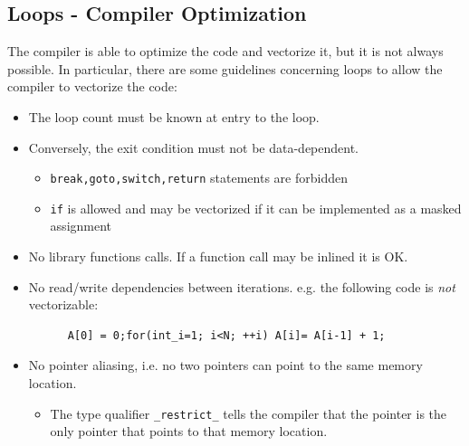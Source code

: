 \subsection{Loops - Compiler Optimization}
The compiler is able to optimize the code and vectorize it, but it is not always possible.
In particular, there are some guidelines concerning loops to allow the compiler to vectorize the code:
\begin{itemize}
   \item The loop count must be known at entry to the loop.
   \item Conversely, the exit condition must not be data-dependent.
   \begin{itemize}
      \item \texttt{break,goto,switch,return} statements are forbidden
      \item \texttt{if} is allowed and may be vectorized if it can be implemented as a masked assignment
   \end{itemize}
   \item No library functions calls. If a function call may be inlined it is OK.
   \item No read/write dependencies between iterations. e.g. the following code is \textit{not} vectorizable:
   \begin{lstlisting}
      A[0] = 0;for(int_i=1; i<N; ++i) A[i]= A[i-1] + 1;
   \end{lstlisting}
   \item No pointer aliasing, i.e. no two pointers can point to the same memory location.
   \begin{itemize}
      \item The type qualifier \lstinline|_restrict_| tells the compiler that the pointer is the only pointer that points to that memory location. 
   \end{itemize}
\end{itemize}